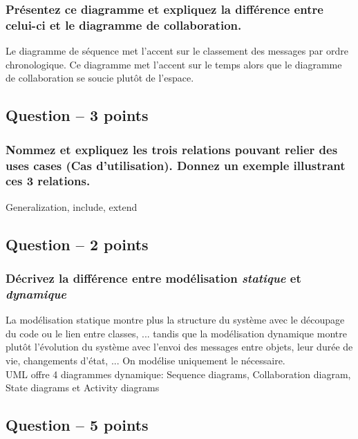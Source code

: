 \subsubsection{Présentez ce diagramme et expliquez la différence entre celui-ci et le diagramme de collaboration.}
\textcolor[rgb]{0,0.48,0.58}{Le diagramme de séquence met l'accent sur le classement des messages par ordre chronologique. Ce diagramme met l'accent sur le temps alors que le diagramme de collaboration se soucie plutôt de l'espace.}



\subsection{Question – 3 points}



\subsubsection{Nommez et expliquez les trois relations pouvant relier des uses cases (Cas d'utilisation). Donnez un exemple illustrant ces 3 relations.}
\textcolor[rgb]{0,0.48,0.58}{Generalization, include, extend}



\subsection{Question – 2 points}



\subsubsection{Décrivez la différence entre modélisation \textsl{statique} et \textsl{dynamique}}
\textcolor[rgb]{0,0.48,0.58}{La modélisation statique montre plus la structure du système
 avec le découpage du code ou le lien entre classes, ... tandis que la modélisation dynamique montre plutôt l’évolution du système avec l'envoi des messages entre objets, leur durée de vie, changements d’état, ... On modélise uniquement le nécessaire.
\\UML offre 4 diagrammes dynamique: Sequence diagrams, Collaboration diagram, State diagrams et Activity diagrams}



\subsection{Question – 5 points}
